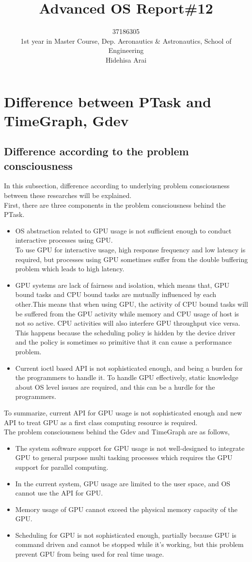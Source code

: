 \documentclass[10pt,a4paper]{ltjsarticle}       %
\title{Advanced OS Report\#12}
\author{37186305\\1st year in Master Course, Dep. Aeronautics \& Astronautics, School of Engineering\\Hidehisa Arai}
\begin{document}
\maketitle
\section{Difference between PTask and TimeGraph, Gdev}
\subsection{Difference according to the problem consciousness}
In this subsection, difference according to underlying problem consciousness between these researches will be explained.\\
First, there are three components in the problem consciousness behind the PTask.
\begin{itemize}
\item OS abstraction related to GPU usage is not sufficient enough to conduct interactive processes using GPU.\\
To use GPU for interactive usage, high response frequency and low latency is required, but processes using GPU sometimes suffer from the double buffering problem which leads to high latency.
\item GPU systems are lack of fairness and isolation, which means that, GPU bound tasks and CPU bound tasks are mutually influenced by each other.This means that when using GPU, the activity of CPU bound tasks will be suffered from the GPU activity while memory and CPU usage of host is not so active. CPU activities will also interfere GPU throughput vice versa. This happens because the scheduling policy is hidden by the device driver and the policy is sometimes so primitive that it can cause a performance problem.
\item Current ioctl based API is not sophisticated enough, and being a burden for the programmers to handle it. To handle GPU effectively, static knowledge about OS level issues are required, and this can be a hurdle for the programmers.
\end{itemize}
To summarize, current API for GPU usage is not sophisticated enough and new API to treat GPU as a first class computing resource is required. \\
The problem consciousness behind the Gdev and TimeGraph are as follows,
\begin{itemize}
\item The system software support for GPU usage is not well-designed to integrate GPU to general purpose multi tasking processes which requires the GPU support for parallel computing.
\item In the current system, GPU usage are limited to the user space, and OS cannot use the API for GPU.
\item Memory usage of GPU cannot exceed the physical memory capacity of the GPU. 
\item Scheduling for GPU is not sophisticated enough, partially because GPU is command driven and cannot be stopped while it's working, but this problem prevent GPU from being used for real time usage.
\end{itemize}
\end{document}

